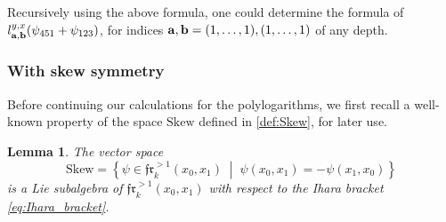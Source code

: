 \documentclass[a4paper,fleqn]{cas-sc}
\newtheorem{lemma}[theorem]{Lemma}
\begin{document}
\begin{rmk}
	Recursively using the above formula, one could determine the formula of $l^{y,x}_{\bf{a},\bf{b}}(\psi_{451}+\psi_{123})$, for indices ${\bf{a,b}}=(1,\dots,1),(1,\dots,1)$ of any depth.
\end{rmk}


\subsubsection{With skew symmetry}
\label{subsubsec:skew}

Before continuing our calculations for the polylogarithms, we first recall a well-known property of the space $\mathrm{Skew}$ defined in \eqref{def:Skew}, for later use.

\begin{lemma}\label{lem:Skew-Lie-subalgebra}
The vector space
\[
\mathrm{Skew}
=
\left\{
\psi\in\mathfrak{fr}^{>1}_k(x_0,x_1)
\;\middle|\;
\psi(x_0,x_1)=-\psi(x_1,x_0)
\right\}
\]
is a Lie subalgebra of
\(\mathfrak{fr}^{>1}_k(x_0,x_1)\) with respect to the Ihara bracket \eqref{eq:Ihara_bracket}.
\end{lemma}
\end{document}
